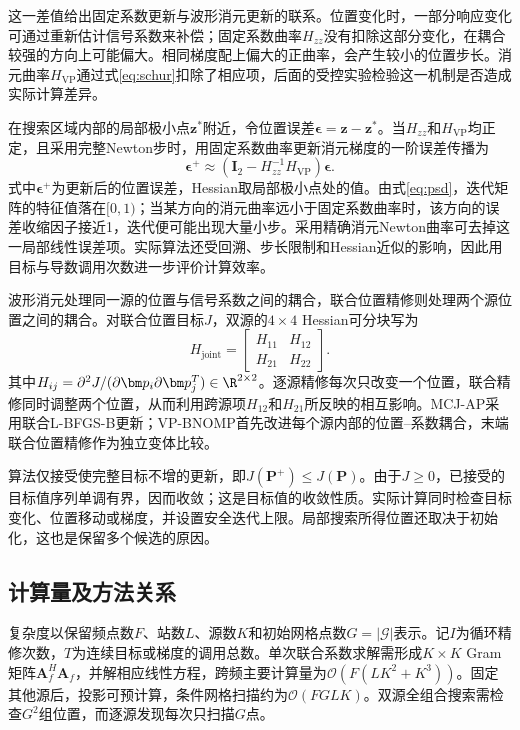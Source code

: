 这一差值给出固定系数更新与波形消元更新的联系。位置变化时，一部分响应变化可通过重新估计信号系数来补偿；固定系数曲率$H_{zz}$没有扣除这部分变化，在耦合较强的方向上可能偏大。相同梯度配上偏大的正曲率，会产生较小的位置步长。消元曲率$H_{\mathrm{VP}}$通过式\eqref{eq:schur}扣除了相应项，后面的受控实验检验这一机制是否造成实际计算差异。

在搜索区域内部的局部极小点$\bm z^*$附近，令位置误差$\bm\epsilon=\bm z-\bm z^*$。当$H_{zz}$和$H_{\mathrm{VP}}$均正定，且采用完整Newton步时，用固定系数曲率更新消元梯度的一阶误差传播为
\begin{equation}
 \bm\epsilon^{+}\approx
 \left(\bm I_2-H_{zz}^{-1}H_{\mathrm{VP}}\right)\bm\epsilon .\label{eq:localrate}
\end{equation}
式中$\bm\epsilon^+$为更新后的位置误差，Hessian取局部极小点处的值。由式\eqref{eq:psd}，迭代矩阵的特征值落在$[0,1)$；当某方向的消元曲率远小于固定系数曲率时，该方向的误差收缩因子接近1，迭代便可能出现大量小步。采用精确消元Newton曲率可去掉这一局部线性误差项。实际算法还受回溯、步长限制和Hessian近似的影响，因此用目标与导数调用次数进一步评价计算效率。

波形消元处理同一源的位置与信号系数之间的耦合，联合位置精修则处理两个源位置之间的耦合。对联合位置目标$J$，双源的$4\times4$ Hessian可分块写为
\begin{equation}
 H_{\mathrm{joint}}=
 \begin{bmatrix}H_{11}&H_{12}\\H_{21}&H_{22}\end{bmatrix} .
\end{equation}
其中$H_{ij}=\partial^2J/(\partial\bm p_i\partial\bm p_j^T)\in\R^{2\times2}$。逐源精修每次只改变一个位置，联合精修同时调整两个位置，从而利用跨源项$H_{12}$和$H_{21}$所反映的相互影响。MCJ-AP采用联合L-BFGS-B更新；VP-BNOMP首先改进每个源内部的位置--系数耦合，末端联合位置精修作为独立变体比较。

算法仅接受使完整目标不增的更新，即$J(\bm P^+)\le J(\bm P)$。由于$J\ge0$，已接受的目标值序列单调有界，因而收敛；这是目标值的收敛性质。实际计算同时检查目标变化、位置移动或梯度，并设置安全迭代上限。局部搜索所得位置还取决于初始化，这也是保留多个候选的原因。

\subsection{计算量及方法关系}\label{sec:complexity}
复杂度以保留频点数$F$、站数$L$、源数$K$和初始网格点数$G=|\mathcal G|$表示。记$I$为循环精修次数，$T$为连续目标或梯度的调用总数。单次联合系数求解需形成$K\times K$ Gram矩阵$\bm A_f^H\bm A_f$，并解相应线性方程，跨频主要计算量为$\mathcal O(F(LK^2+K^3))$。固定其他源后，投影可预计算，条件网格扫描约为$\mathcal O(FGLK)$。双源全组合搜索需检查$G^2$组位置，而逐源发现每次只扫描$G$点。

